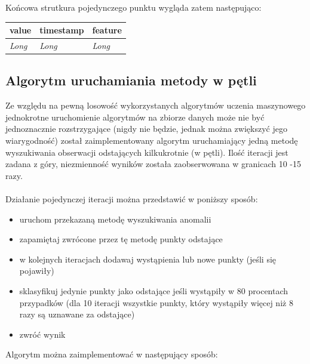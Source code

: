 \documentclass[eng,printmode]{mgr}
\begin{document}
Końcowa strutkura pojedynczego punktu wygląda zatem następująco:
\\
\begingroup
\fontsize{10pt}{12pt}\selectfont

\begin{tabu} to 0.9\textwidth { | X[l] | X[l] | X[l] |}
\hline
\textbf{value} & \textbf{timestamp} & \textbf{feature} \\
\hline
\textit{Long}  & \textit{Long}  & \textit{Long} \\
\hline
\end{tabu}
\endgroup

\subsection{Algorytm uruchamiania metody w pętli}
Ze względu na pewną losowość wykorzystanych algorytmów uczenia maszynowego jednokrotne uruchomienie algorytmów na zbiorze danych może nie być jednoznacznie rozstrzygające (nigdy nie będzie, jednak można zwiększyć jego wiarygodność) został zaimplementowany algorytm uruchamiający jedną metodę wyszukiwania obserwacji odstających kilkukrotnie (w pętli). Ilość iteracji jest zadana z góry, niezmienność wyników została zaobserwowana w granicach 10 -15 razy. 
\\\\
Działanie pojedynczej iteracji można przedstawić w poniższy sposób:

\begin{itemize}
  \item uruchom przekazaną metodę wyszukiwania anomalii
  \item zapamiętaj zwrócone przez tę metodę punkty odstające
  \item w kolejnych iteracjach dodawaj wystąpienia lub nowe punkty (jeśli się pojawiły)
  \item sklasyfikuj jedynie punkty jako odstające jeśli wystąpiły w 80 procentach przypadków (dla 10 iteracji wszystkie punkty, który wystąpiły więcej niż 8 razy są uznawane za odstające)
  \item zwróć wynik
\end{itemize}

Algorytm można zaimplementować w następujący sposób:
\end{document}
